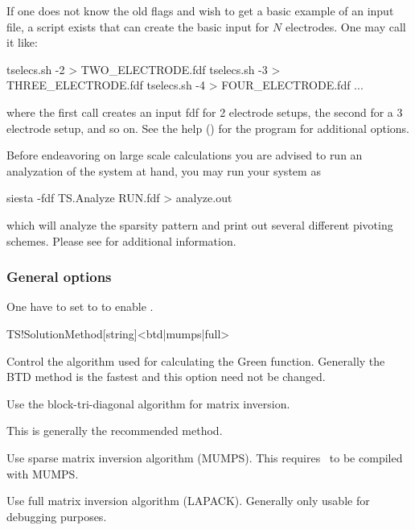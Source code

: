 If one does not know the old flags and wish to get a basic example of
an input file, a script  exists that can
create the basic input for $N$ electrodes. One may call it like:
\begin{shellexample}
  tselecs.sh -2 > TWO_ELECTRODE.fdf
  tselecs.sh -3 > THREE_ELECTRODE.fdf
  tselecs.sh -4 > FOUR_ELECTRODE.fdf
  ...
\end{shellexample}
where the first call creates an input fdf for 2 electrode setups, the
second for a 3 electrode setup, and so on. See the help ()
for the program for additional options.

Before endeavoring on large scale calculations you are advised to run
an analyzation of the system at hand, you may run your system as
\begin{shellexample}
  siesta -fdf TS.Analyze RUN.fdf > analyze.out
\end{shellexample}
which will analyze the sparsity pattern and print out several
different pivoting schemes. Please see  for additional
information.


\subsubsection{General options}

One have to set  to  to enable
\tsiesta.

\begin{fdfentry}{TS!SolutionMethod}[string]<btd|mumps|full>

  Control the algorithm used for calculating the Green
  function. Generally the BTD method is the fastest and this option
  need not be changed.

  \begin{fdfoptions}
    \option[BTD]%
    Use the block-tri-diagonal algorithm for matrix inversion.

    This is generally the recommended method.

    \option[MUMPS]%
    Use sparse matrix inversion algorithm (MUMPS). This requires
    \tsiesta\ to be compiled with MUMPS.

    \option[full]%
    Use full matrix inversion algorithm (LAPACK). Generally only
    usable for debugging purposes.
    
  \end{fdfoptions}
  
\end{fdfentry}


